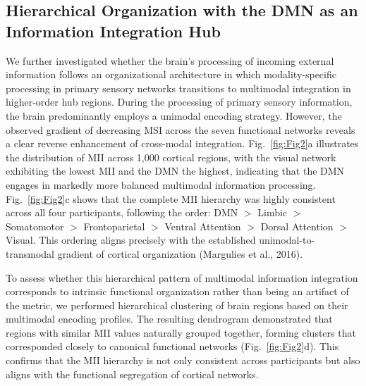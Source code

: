 \documentclass[10pt,letterpaper]{article}
\begin{document}
\subsection{Hierarchical Organization with the DMN as an Information Integration Hub}

We further investigated whether the brain’s processing of incoming external information follows an organizational architecture in which modality-specific processing in primary sensory networks transitions to multimodal integration in higher-order hub regions. During the processing of primary sensory information, the brain predominantly employs a unimodal encoding strategy. However, the observed gradient of decreasing MSI across the seven functional networks reveals a clear reverse enhancement of cross-modal integration. Fig.~\ref{fig:Fig2}a illustrates the distribution of MII across 1,000 cortical regions, with the visual network exhibiting the lowest MII and the DMN the highest, indicating that the DMN engages in markedly more balanced multimodal information processing. Fig.~\ref{fig:Fig2}c shows that the complete MII hierarchy was highly consistent across all four participants, following the order: DMN $>$ Limbic $>$ Somatomotor $>$ Frontoparietal $>$ Ventral Attention $>$ Dorsal Attention $>$ Visual. This ordering aligns precisely with the established unimodal-to-transmodal gradient of cortical organization (Margulies et al., 2016). 


To assess whether this hierarchical pattern of multimodal information integration corresponds to intrinsic functional organization rather than being an artifact of the metric, we performed hierarchical clustering of brain regions based on their multimodal encoding profiles. The resulting dendrogram demonstrated that regions with similar MII values naturally grouped together, forming clusters that corresponded closely to canonical functional networks (Fig.~\ref{fig:Fig2}d). This confirms that the MII hierarchy is not only consistent across participants but also aligns with the functional segregation of cortical networks.
\end{document}
